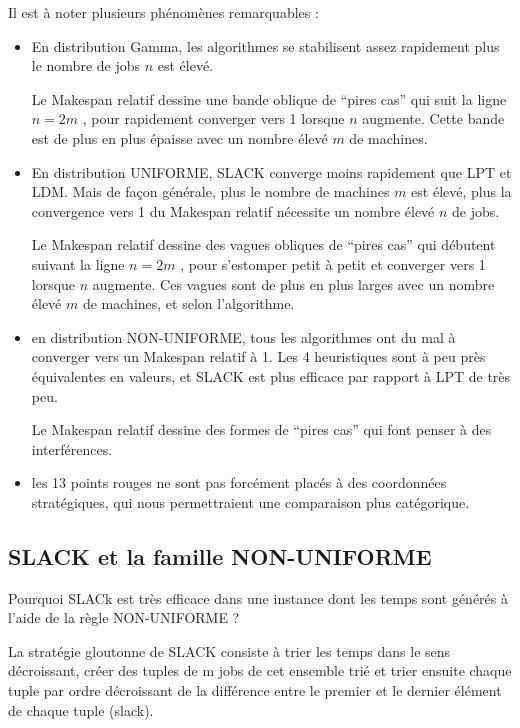 \documentclass[a4paper,12pt]{report}
\theoremstyle{plain}				%
\theoremstyle{definition}				%
\begin{document}
Il est à noter plusieurs phénomènes remarquables :
\begin{itemize}
	\item En distribution Gamma, les algorithmes se stabilisent 
	assez rapidement plus le nombre de jobs $n$ est élevé.
	
	Le Makespan relatif dessine une bande oblique de ``pires cas'' 
	qui suit la ligne $n = 2m$ , pour rapidement converger vers 1 
	lorsque $n$ augmente. 
	Cette bande est de plus en plus épaisse avec un nombre 
	élevé $m$ de machines.
	 
	\item En distribution UNIFORME, SLACK converge moins rapidement que 
	LPT et LDM. Mais de façon générale, plus le nombre de machines $m$ 
	est élevé, plus la convergence vers 1 du Makespan relatif nécessite 
	un nombre élevé $n$ de jobs.
	
	Le Makespan relatif dessine des vagues obliques de ``pires cas'' 
	qui débutent suivant la ligne $n = 2m$ , pour s'estomper petit à petit 
	et converger vers 1 lorsque $n$ augmente. 
	Ces vagues sont de plus en plus larges avec un nombre 
	élevé $m$ de machines, et selon l'algorithme.
	
	\item en distribution NON-UNIFORME, tous les algorithmes ont du mal 
	à converger vers un Makespan relatif à 1. Les 4 heuristiques sont à 
	peu près équivalentes en valeurs, et SLACK est plus efficace par 
	rapport à LPT de très peu.
	
	Le Makespan relatif dessine des formes de ``pires cas'' qui font penser 
	à des interférences.
	
	\item les 13 points rouges ne sont pas forcément placés à des 
	coordonnées stratégiques, qui nous permettraient une comparaison 
	plus catégorique. 
\end{itemize}

\subsection{SLACK et la famille NON-UNIFORME}
\label{ssec:resultatsSLACKNonUniforme}

Pourquoi SLACk est très efficace dans une instance dont les temps sont générés à l'aide de la 
  règle NON-UNIFORME ? 
  
La stratégie gloutonne de SLACK consiste à 
  trier les temps dans le sens décroissant,
  créer des tuples de m jobs de cet ensemble trié 
  et trier ensuite chaque tuple par ordre décroissant de la différence 
  entre le premier et le dernier élément de chaque tuple (slack).
\end{document}
